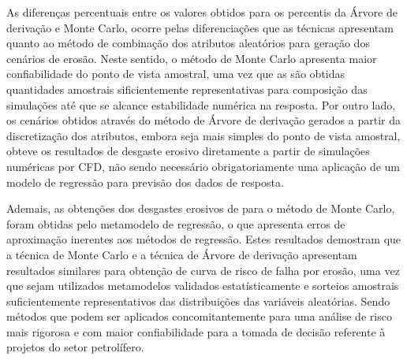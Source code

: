 As diferenças percentuais entre os valores obtidos para os percentis da Árvore de derivação e Monte Carlo, ocorre pelas diferenciações que as técnicas apresentam quanto ao método de combinação dos atributos aleatórios para geração dos cenários de erosão. Neste sentido, o método de Monte Carlo apresenta maior confiabilidade do ponto de vista amostral, uma vez que as são obtidas quantidades amostrais sificientemente representativas para composição das simulações até que se alcance estabilidade numérica na resposta. Por outro lado, os cenários obtidos através do método de Árvore de derivação gerados a partir da discretização dos atributos, embora seja mais simples do ponto de vista amostral, obteve os resultados de desgaste erosivo diretamente a partir de simulações numéricas por CFD, não sendo necessário obrigatoriamente uma aplicação de um modelo de regressão para previsão dos dados de resposta.

Ademais, as obtenções dos desgastes erosivos de  para o método de Monte Carlo, foram obtidas pelo metamodelo de regressão, o que apresenta erros de aproximação inerentes aos métodos de regressão. Estes resultados demostram que a técnica de Monte Carlo e a técnica de Árvore de derivação apresentam resultados similares para obtenção de curva de risco de falha por erosão, uma vez que sejam utilizados metamodelos validados estatísticamente e sorteios amostrais suficientemente representativos das distribuições das variáveis aleatórias. Sendo métodos que podem ser aplicados concomitantemente para uma análise de risco mais rigorosa e com maior confiabilidade para a tomada de decisão referente à projetos do setor petrolífero.

  




